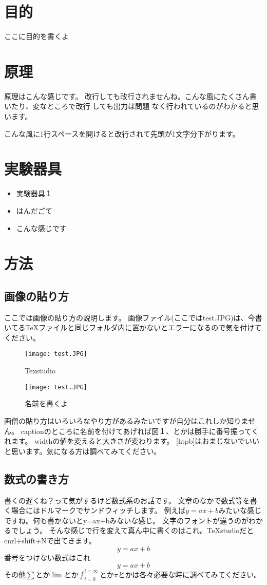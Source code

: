 \documentclass[11pt,a4paper]{jsarticle}
\begin{document}
\section{目的}
ここに目的を書くよ

\section{原理}
原理はこんな感じです。
改行しても改行されませんね。こんな風にたくさん書いたり、変なところで改行
しても出力は問題
なく行われているのがわかると思います。

こんな風に1行スペースを開けると改行されて先頭が1文字分下がります。
\section{実験器具}
\begin{itemize}
\item 実験器具１
\item はんだごて
\item こんな感じです
\end{itemize}

\section{方法}
\subsection{画像の貼り方}
ここでは画像の貼り方の説明します。
画像ファイル(ここではtest.JPG)は、今書いてるTeXファイルと同じフォルダ内に置かないとエラーになるので気を付けてください。
\begin{figure}[htbp]
\centering
\texttt{[image: test.JPG]}
\caption{Texstudio}
\end{figure}

\begin{figure}[htbp]
\centering
\texttt{[image: test.JPG]}
\caption{名前を書くよ}
\end{figure}
画僧の貼り方はいろいろなやり方があるみたいですが自分はこれしか知りません。
captionのところに名前を付けてあげれば図１、とかは勝手に番号振ってくれます。
widthの値を変えると大きさが変わります。
[htpb]はおまじないでいいと思います。気になる方は調べてみてください。

\subsection{数式の書き方}
書くの遅くね？って気がするけど数式系のお話です。
文章のなかで数式等を書く場合にはドルマークでサンドウィッチします。
例えば$y=ax+b$みたいな感じですね。何も書かないとy=ax+bみないな感じ。
文字のフォントが違うのがわかるでしょう。
そんな感じで行を変えて真ん中に書くのはこれ。TeXstudioだとcnrl+shift+Nで出てきます。
\begin{equation}\label{key}
y=ax+b
\end{equation}
番号をつけない数式はこれ
\[
y=ax+b
\]
その他$\sum$とか$\lim$とか$\int_{t=0}^{t=\infty}$とか$\pi$とかは各々必要な時に調べてみてください。
\end{document}
